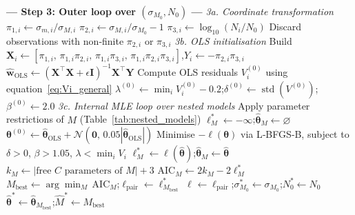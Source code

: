 \begin{algorithm}[htbp]
\begin{algorithmic}[1]
\Statex \textbf{--- Step 3: Outer loop over $(\sigma_{M_0},N_0)$ ---}
  \Statex\hspace{1.5em} \textit{3a. Coordinate transformation}
    \State $\pi_{1,i}\leftarrow\sigma_{m,i}/\sigma_{M,i}$
    \State $\pi_{2,i}\leftarrow\sigma_{M,i}/\sigma_{M_0}-1$ \hfill{}
    \State $\pi_{3,i}\leftarrow\log_{10}(N_i/N_0)$ \hfill{}
  \EndFor
  \State Discard observations with non‑finite $\pi_{2,i}$ or $\pi_{3,i}$
  \Statex\hspace{1.5em} \textit{3b. OLS initialisation}
  \State Build $\mathbf{X}_i\leftarrow[\pi_{1,i},\,\pi_{1,i}\pi_{2,i},\,\pi_{1,i}\pi_{3,i},\,\pi_{1,i}\pi_{2,i}\pi_{3,i}]$,\quad $Y_i\leftarrow-\pi_{2,i}\pi_{3,i}$
  \State $\hat{\mathbf{w}}_{\mathrm{OLS}}\leftarrow(\mathbf{X}^\top\mathbf{X}+\epsilon\mathbf{I})^{-1}\mathbf{X}^\top\mathbf{Y}$
  \State Compute OLS residuals $V_i^{(0)}$ using equation~\eqref{eq:Vi_general}
  \State $\lambda^{(0)}\leftarrow\min_i V_i^{(0)}-0.2$;\quad $\delta^{(0)}\leftarrow\operatorname{std}(V^{(0)})$;\quad $\beta^{(0)}\leftarrow 2.0$
  \Statex\hspace{1.5em} \textit{3c. Internal MLE loop over nested models}
    \State Apply parameter restrictions of $M$ (Table~\ref{tab:nested_models})
    \State $\ell^*_M\leftarrow-\infty$;\quad $\hat{\boldsymbol{\theta}}_M\leftarrow\varnothing$
      \State $\boldsymbol{\theta}^{(0)}\leftarrow \hat{\boldsymbol{\theta}}_{\mathrm{OLS}} + \mathcal{N}(\mathbf{0},\,0.05|\hat{\boldsymbol{\theta}}_{\mathrm{OLS}}|)$
      \State Minimise $-\ell(\boldsymbol{\theta})$ via L‑BFGS‑B, subject to $\delta>0$, $\beta>1.05$, $\lambda<\min_i V_i$
        \State $\ell^*_M\leftarrow\ell(\hat{\boldsymbol{\theta}})$;\quad $\hat{\boldsymbol{\theta}}_M\leftarrow\hat{\boldsymbol{\theta}}$
      \EndIf
    \EndFor
    \State $k_M\leftarrow|\text{free }C\text{ parameters of }M|+3$
    \State $\mathrm{AIC}_M\leftarrow 2k_M-2\ell^*_M$
  \EndFor
  \State $M_{\mathrm{best}}\leftarrow\arg\min_M\,\mathrm{AIC}_M$;\quad $\ell_{\mathrm{pair}}\leftarrow\ell^*_{M_{\mathrm{best}}}$
    \State $\ell^{}\leftarrow\ell_{\mathrm{pair}}$;\quad $\sigma_{M_0}^*\leftarrow\sigma_{M_0}$;\quad $N_0^*\leftarrow N_0$
    \State $\hat{\boldsymbol{\theta}}^*\leftarrow\hat{\boldsymbol{\theta}}_{M_{\mathrm{best}}}$;\quad $\hat{M}^*\leftarrow M_{\mathrm{best}}$
  \EndIf
\EndFor


\end{algorithmic}
\end{algorithm}
